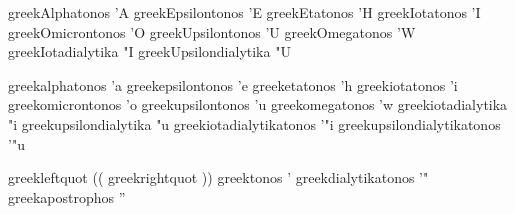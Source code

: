 
 greekAlphatonos       {'A}
 greekEpsilontonos     {'E}
 greekEtatonos         {'H}
 greekIotatonos        {'I}
 greekOmicrontonos     {'O}
 greekUpsilontonos     {'U}
 greekOmegatonos       {'W}
 greekIotadialytika    {"I}
 greekUpsilondialytika {"U}


 greekalphatonos            {'a}
 greekepsilontonos          {'e}
 greeketatonos              {'h}
 greekiotatonos             {'i}
 greekomicrontonos          {'o}
 greekupsilontonos          {'u}
 greekomegatonos            {'w}
 greekiotadialytika         {"i}
 greekupsilondialytika      {"u}
 greekiotadialytikatonos    {'"i}
 greekupsilondialytikatonos {'"u}


 greekleftquot       {((}
 greekrightquot      {))}
 greektonos          {'}
 greekdialytikatonos {'"}
 greekapostrophos    {''}

\stopencoding


\startencoding[default]

